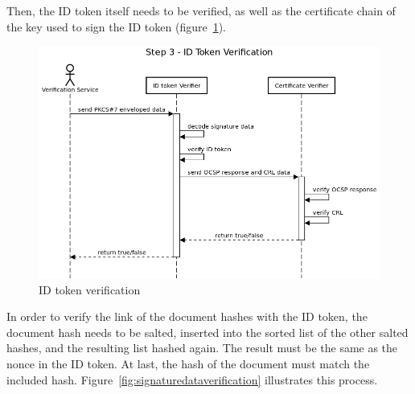 Then, the ID token itself needs to be verified,
as well as the certificate chain of the key used to sign the ID token (figure~\ref{fig:idtokenverification}).

\begin{figure}
    \begin{center}
        \includegraphics[scale=0.5]{images/protocol_verification_step3_id_token.png}
        \caption{ID token verification}
        \label{fig:idtokenverification}
    \end{center}
\end{figure}

In order to verify the link of the document hashes with the ID token,
the document hash needs to be salted, inserted into the sorted list of the other salted hashes,
and the resulting list hashed again.
The result must be the same as the nonce in the ID token.
At last, the hash of the document must match the included hash.
Figure~\ref{fig:signaturedataverification} illustrates this process.

